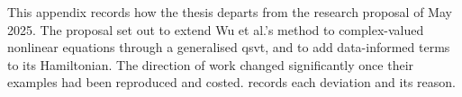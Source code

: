 %


This appendix records how the thesis departs from the research proposal of May 2025. The proposal set out to extend Wu et al.'s method to complex-valued nonlinear equations through a generalised \gls{qsvt}, and to add data-informed terms to its Hamiltonian. The direction of  work changed significantly once their examples had been reproduced and costed.  records each deviation and its reason.

